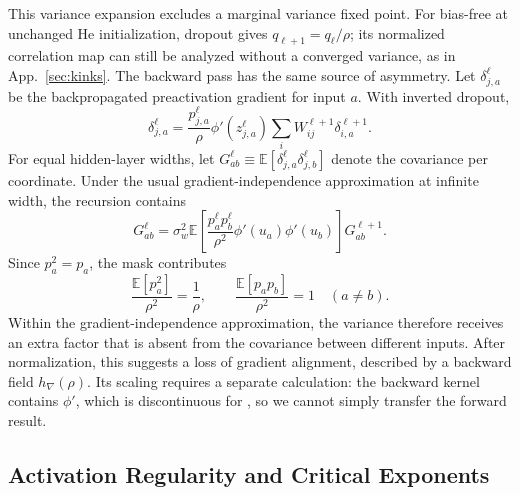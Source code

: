 This variance expansion excludes a marginal variance fixed point. For bias-free \relu{} at unchanged He initialization, dropout gives $q_{\ell+1}=q_\ell/\rho$; its normalized correlation map can still be analyzed without a converged variance, as in App.~\ref{sec:kinks}.
The backward pass has the same source of asymmetry. Let \(\delta^\ell_{j,a}\) be the backpropagated preactivation gradient for input \(a\). With inverted dropout,
\begin{equation}
\delta^\ell_{j,a} = \frac{p^\ell_{j,a}}{\rho} \phi'(z^\ell_{j,a}) \sum_i W^{\ell+1}_{ij}\delta^{\ell+1}_{i,a}.
\end{equation}
For equal hidden-layer widths, let \(G^\ell_{ab}\equiv \mathbb E[\delta^\ell_{j,a}\delta^\ell_{j,b}]\) denote the covariance per coordinate. Under the usual gradient-independence approximation at infinite width, the recursion contains
\begin{equation}
G^\ell_{ab} = \sigma_w^2 \mathbb E\left[ \frac{p^\ell_a p^\ell_b}{\rho^2} \phi'(u_a)\phi'(u_b) \right] G^{\ell+1}_{ab}.
\end{equation}
Since $p_a^2=p_a$, the mask contributes
\[
\frac{\mathbb E[p_a^2]}{\rho^2}=\frac1\rho,
\qquad
\frac{\mathbb E[p_ap_b]}{\rho^2}=1\quad(a\ne b).
\]
Within the gradient-independence approximation, the variance therefore receives an extra factor that is absent from the covariance between different inputs. After normalization, this suggests a loss of gradient alignment, described by a backward field $h_\nabla(\rho)$. Its scaling requires a separate calculation: the backward kernel contains $\phi'$, which is discontinuous for \relu{}, so we cannot simply transfer the forward result.

\subsection{Activation Regularity and Critical Exponents}

